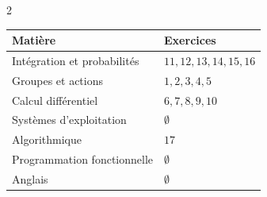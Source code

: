\documentclass{article}
\begin{document}
\setlength{\columnsep}{2cm}

\begin{paracol}{2}

\renewcommand{\arraystretch}{1.3}
\noindent
\begin{tabular}{|p{}|>{\centering\arraybackslash}p{}|}
\hline
\rowcolor[RGB]{230,237,247}
\textbf{Matière} & \textbf{Exercices} \\
\hline
Intégration et probabilités & $11,12,13,14,15,16$\\
\hline
Groupes et actions & $1,2,3,4,5$\\
\hline
Calcul différentiel & $6,7,8,9,10$\\
\hline
Systèmes d'exploitation & $\emptyset$\\
\hline
Algorithmique & $17$\\
\hline
Programmation fonctionnelle & $\emptyset$\\
\hline
Anglais & $\emptyset$\\
\hline
\end{tabular}

\vspace{1em}
\end{paracol}
\end{document}
